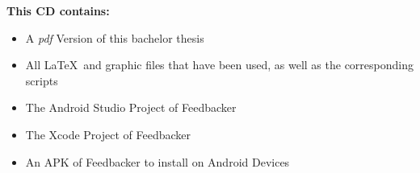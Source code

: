 \pagebreak
\thispagestyle{empty}

\begin{center}
  \vspace{-3cm}
\end{center}

\vfill

\textbf{This CD contains:}
\begin{itemize}
 \item A \emph{pdf} Version of this bachelor thesis
 \item All \LaTeX\ and graphic files that have been used, as well as the corresponding scripts
 \item The Android Studio Project of Feedbacker
 \item The Xcode Project of Feedbacker
 \item An APK of Feedbacker to install on Android Devices
\end{itemize}
